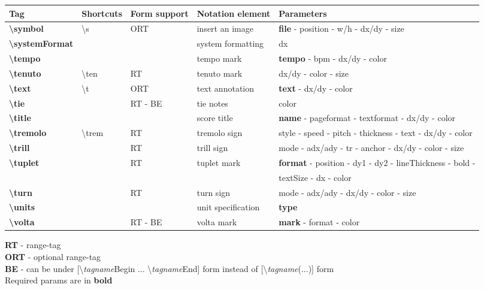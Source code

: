 \documentclass[a4paper, landscape, 10pt]{article}
\begin{document}
%
%
\begin{tabularx}{\linewidth}{p{3cm}p{4.5cm}p{3cm}p{5.5cm}l}
    \hline
    \textbf{Tag}&\textbf{Shortcuts}&\textbf{Form support}&\textbf{Notation element}&\textbf{Parameters}\\
    \hline
    \textbf{\textbackslash{}symbol}&\textbackslash{}s&ORT&insert an image&\textbf{file} - position - w/h - dx/dy - size\\
    \hline
    \textbf{\textbackslash{}systemFormat}&&&system formatting&dx\\
    \hline
    \textbf{\textbackslash{}tempo}&&&tempo mark&\textbf{tempo} - bpm - dx/dy - color\\
    \hline
    \textbf{\textbackslash{}tenuto}&\textbackslash{}ten&RT&tenuto mark&dx/dy - color - size\\
    \hline
    \textbf{\textbackslash{}text}&\textbackslash{}t&ORT&text annotation&\textbf{text} - dx/dy - color\\
    \hline
    \textbf{\textbackslash{}tie}&&RT - BE&tie notes&color\\
    \hline
    \textbf{\textbackslash{}title}&&&score title&\textbf{name} - pageformat - textformat - dx/dy - color\\
    \hline
    \textbf{\textbackslash{}tremolo}&\textbackslash{}trem&RT&tremolo sign&style - speed - pitch - thickness - text - dx/dy - color\\
    \hline
    \textbf{\textbackslash{}trill}&&RT&trill sign&mode - adx/ady - tr - anchor - dx/dy - color - size\\
    \hline
    \textbf{\textbackslash{}tuplet}&&RT&tuplet mark&\textbf{format} - position - dy1 - dy2 - lineThickness - bold -\\
    &&&& textSize - dx - color\\
    \hline
    \textbf{\textbackslash{}turn}&&RT&turn sign&mode - adx/ady - dx/dy - color - size\\
    \hline
    \textbf{\textbackslash{}units}&&&unit specification&\textbf{type}\\
    \hline
    \textbf{\textbackslash{}volta}&&RT - BE&volta mark&\textbf{mark} - format - color\\
    \hline
\end{tabularx}

\bigskip

\textbf{RT} - range-tag \\
\textbf{ORT} - optional range-tag \\
\textbf{BE} - can be under [\textbackslash{}\emph{tagname}Begin ... \textbackslash{}\emph{tagname}End] form instead of [\textbackslash{}\emph{tagname}(...)] form\\
Required params are in \textbf{bold}
\end{document}
